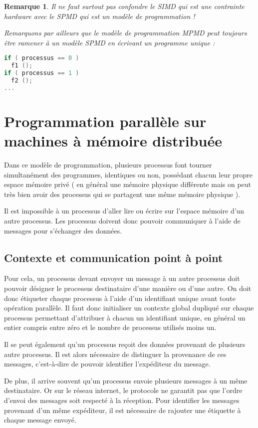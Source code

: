 \documentclass[fleqn,11pt]{article}
\newtheorem{remark}{Remarque}
\begin{document}
\begin{remark}
Il ne faut surtout pas confondre le SIMD qui est une contrainte hardware avec
le SPMD qui est un modèle de programmation ! 

Remarquons par ailleurs que le modèle de programmation MPMD peut toujours 
être ramener à un modèle SPMD en écrivant un programme unique :

\begin{lstlisting}[language=C++]
if ( processus == 0 )
  f1 ();
if ( processus == 1 )
  f2 ();
...
\end{lstlisting} 
\end{remark}

\section{Programmation parallèle sur machines à mémoire distribuée}

Dans ce modèle de programmation, plusieurs processus font tourner 
simultanément des programmes, identiques ou non, possédant chacun leur propre espace mémoire privé ( en général
une mémoire physique différente mais on peut très bien avoir des processus qui
se partagent une même mémoire physique ).

Il est impossible à un processus d'aller lire ou écrire sur l'espace mémoire d'un autre
processus. Les processus doivent donc pouvoir communiquer à l'aide de messages pour
s'échanger des données.

\subsection{Contexte et communication point à point}

Pour cela, un processus devant envoyer un message à un autre processus doit
pouvoir désigner le processus destinataire d'une manière ou d'une autre.
On doit donc étiqueter chaque processus à l'aide d'un identifiant unique
avant toute opération parallèle. Il faut donc initialiser un contexte
global dupliqué sur chaque processus permettant d'attribuer à chacun un identifiant
unique, en général un entier compris entre zéro et le nombre 
de processus utilisés moins un.

Il se peut également qu'un processus reçoit des données provenant de plusieurs
autre processus. Il est alors nécessaire de distinguer la provenance de ces messages, c'est-à-dire
de pouvoir identifier l'expéditeur du message.

De plus, il arrive souvent qu'un processus envoie plusieurs messages à un même destinataire. Or
sur le réseau internet, le protocole ne garantit pas que l'ordre d'envoi
des messages soit respecté à la réception. Pour identifier les messages provenant
d'un même expéditeur, il est nécessaire de rajouter une étiquette à chaque message
envoyé.
\end{document}
